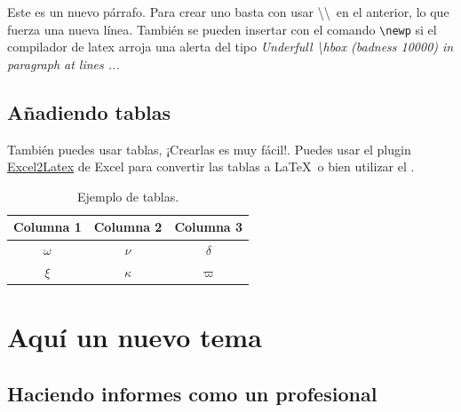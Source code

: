 	Este es un nuevo párrafo. Para crear uno basta con usar \textbackslash\textbackslash\ en el anterior, lo que fuerza una nueva línea. También se pueden insertar con el comando \texttt{\textbackslash newp} si el compilador de latex arroja una alerta del tipo \textit{Underfull \textbackslash hbox (badness 10000) in paragraph at lines ...}

\subsection{Añadiendo tablas}

	También puedes usar tablas, ¡Crearlas es muy fácil!. Puedes usar el plugin \href{https://www.ctan.org/tex-archive/support/excel2latex}{Excel2Latex} \cite{excel2latex} de Excel para convertir las tablas a \LaTeX\ o bien utilizar el  \cite{tablesgenerator}.

	\begin{table}[H]
		\centering
		\caption{Ejemplo de tablas.}
		\begin{tabular}{ccc}
			\hline
			\textbf{Columna 1} & \textbf{Columna 2} & \textbf{Columna 3} \bigstrut\\
			\hline
			$\omega$ & $\nu$ & $\delta$ \bigstrut[t]\\
			$\xi$ & $\kappa$ & $\varpi$ \bigstrut[b] \\
			\hline
		\end{tabular}
		\label{tab:tabla-1}
	\end{table}


\clearpage
\section{Aquí un nuevo tema}

\subsection{Haciendo informes como un profesional}



